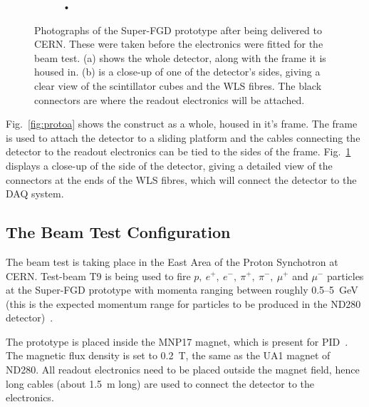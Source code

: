 \documentclass[aps,pra,12pt,notitlepage,tightenlines]{revtex4-1}
\begin{document}
\begin{figure}
\begin{subfigure}{.5\textwidth}
   \caption{•}
   \label{fig:protob}
  \end{subfigure}
  \caption{Photographs of the Super-FGD prototype after being delivered to CERN. These were taken before the electronics were fitted for the beam test. (a) shows the whole detector, along with the frame it is housed in. (b) is a close-up of one of the detector's sides, giving a clear view of the scintillator cubes and the WLS fibres. The black connectors are where the readout electronics will be attached.}
  \label{fig:proto}
 \end{figure}
Fig.\ \ref{fig:protoa} shows the construct as a whole, housed in it's frame. The frame is used to attach the detector to a sliding platform and the cables connecting the detector to the readout electronics can be tied to the sides of the frame. Fig.\ \ref{fig:protob} displays a close-up of the side of the detector, giving a detailed view of the connectors at the ends of the WLS fibres, which will connect the detector to the DAQ system.

\subsection{The Beam Test Configuration}
The beam test is taking place in the East Area of the Proton Synchotron at CERN. Test-beam T9 is being used to fire $p, \ e^+, \ e^-, \ \pi^+, \ \pi^-, \ \mu^+$ and $\mu^-$ particles at the Super-FGD prototype with momenta ranging between roughly 0.5--5~GeV (this is the expected momentum range for particles to be produced in the ND280 detector)~\cite{Durieu2001}. 

The prototype is placed inside the MNP17 magnet, which is present for PID~\cite{Brooks2015}. The magnetic flux density is set to 0.2~T, the same as the UA1 magnet of ND280. All readout electronics need to be placed outside the magnet field, hence long cables (about 1.5~m long) are used to connect the detector to the electronics. 
\end{document}
